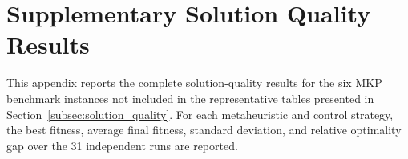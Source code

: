 \documentclass[journal,article,submit,moreauthors]{Definitions/mdpi}
\begin{document}

\appendix
\section{Supplementary Solution Quality Results}
\label{sec:appendix_tables}

This appendix reports the complete solution-quality results for the six
MKP benchmark instances not included in the representative tables presented
in Section~\ref{subsec:solution_quality}. For each metaheuristic and control
strategy, the best fitness, average final fitness, standard deviation, and
relative optimality gap over the 31 independent runs are reported.


\end{document}
